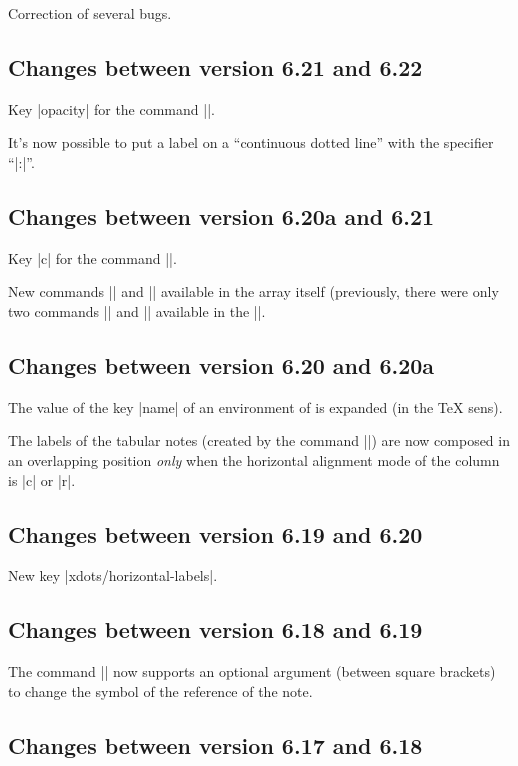 \documentclass[dvipsnames]{article}%
\begin{document}
Correction of several bugs.

\subsection*{Changes between version 6.21 and 6.22}

Key |opacity| for the command |\Block|.

It's now possible to put a label on a ``continuous dotted line'' with the
specifier ``|:|''.


\subsection*{Changes between version 6.20a and 6.21}

Key |c| for the command |\tabularnote|.

New commands |\rowcolors| and |\rowlistcolors| available in the array itself
(previously, there were only two commands |\rowcolors| and |\rowlistcolors|
available in the |\CodeBefore|.


\subsection*{Changes between version 6.20 and 6.20a}

The value of the key |name| of an environment of  is expanded
(in the TeX sens).

The labels of the tabular notes (created by the command |\tabularnote|) are now
composed in an overlapping position \emph{only} when the horizontal alignment
mode of the column is |c| or |r|.

\subsection*{Changes between version 6.19 and 6.20}

New key |xdots/horizontal-labels|.

\subsection*{Changes between version 6.18 and 6.19}

The command |\tabularnote| now supports an optional argument (between square
brackets) to change the symbol of the reference of the note.

\subsection*{Changes between version 6.17 and 6.18}
\end{document}
